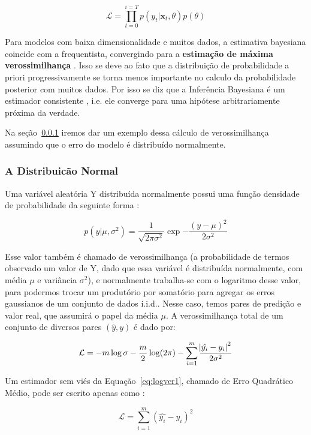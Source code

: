 \[
  \mathcal{L} = \prod_{t=0}^{i=T}p(y_t|\textbf{x}_{t},\theta)p(\theta) 
\]


Para modelos com baixa dimensionalidade e muitos dados, a estimativa bayesiana
coincide com a frequentista, convergindo para a \textbf{estimação de máxima
verossimilhança} \citep{mlprob}. Isso se deve ao fato que a distribuição de
probabilidade a priori progressivamente se torna menos importante no calculo da
probabilidade posterior com muitos dados. Por isso se diz que a Inferência
Bayesiana é um estimador consistente \citep{mlprob}, i.e. ele converge para uma
hipótese arbitrariamente próxima da verdade.


Na seção~\ref{sec:reglog} iremos dar um exemplo dessa cálculo de verossimilhança
assumindo que o erro do modelo é distribuído normalmente.

\subsubsection{A Distribuicão Normal}
\label{sec:reglog}

Uma variável aleatória Y distribuída normalmente possui uma função densidade de
probabilidade da seguinte forma \citep{mlprob}:

\begin{equation}
  \label{eq:ver}
p(y| \mu,\sigma^2) = \frac{1}{\sqrt{2\pi\sigma^2}}\exp{-\frac{(y - \mu)^2}{2\sigma^2}}
\end{equation}

Esse valor também é chamado de verossimilhança (a probabilidade de termos
observado um valor de Y, dado que essa variável é distribuída normalmente, com média $\mu$ e variância $\sigma^2$), e
normalmente trabalha-se com o logaritmo desse valor, para podermos trocar um
produtório por somatório para agregar os erros gaussianos de um conjunto de dados
i.i.d.. Nesse caso, temos pares de predição e valor real, que assumirá o papel
da média $\mu$. A verossimilhança total de um conjunto de diversos pares
$(\hat{y},y)$ é dado por: 

\begin{equation}
\label{eq:logver1}
  \mathcal{L}= -m \log \sigma - \frac{m}{2} \log (2 \pi) - \sum^m_{i=1}
  \frac{\abs{\hat{y_i}-y_i}^2}{2 \sigma^2}
\end{equation}

Um estimador sem viés da Equação~\ref{eq:logver1}, chamado de Erro Quadrático
Médio, pode ser escrito apenas como \citep{mlprob}:

\begin{equation}
  \label{eq:logver2}
  \mathcal{L}=  \sum^m_{i=1} (\hat{y_i}-y_i)^2
\end{equation}


